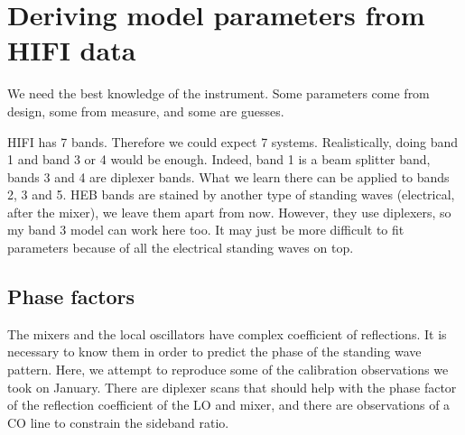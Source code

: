 \section{Deriving model parameters from HIFI data}
We need the best knowledge of the instrument.
Some parameters come from design, some from measure, and some are guesses.

HIFI has 7 bands.  Therefore we could expect 7 systems.
Realistically, doing band 1 and band 3 or 4 would be enough.
Indeed, band 1 is a beam splitter band, bands 3 and 4 are diplexer bands.
What we learn there can be applied to bands 2, 3 and 5.
HEB bands are stained by another type of standing waves (electrical, after the mixer), we leave them apart from now.
However, they use diplexers, so my band 3 model can work here too.  It may just be more difficult to fit parameters because of all the electrical standing waves on top.

\subsection{Phase factors}
The mixers and the local oscillators have complex coefficient of reflections.
It is necessary to know them in order to predict the phase of the standing wave pattern.
Here, we attempt to reproduce some of the calibration observations we took on January.  There are diplexer scans that should help with the phase factor of the reflection coefficient of the LO and mixer, and there are observations of a CO line to constrain the sideband ratio.

